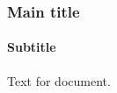 \documentclass{beamer}
\begin{document}
\begin{frame}
\frametitle{Main title}
\framesubtitle{Subtitle}
Text for document.
\end{frame}
\end{document}
